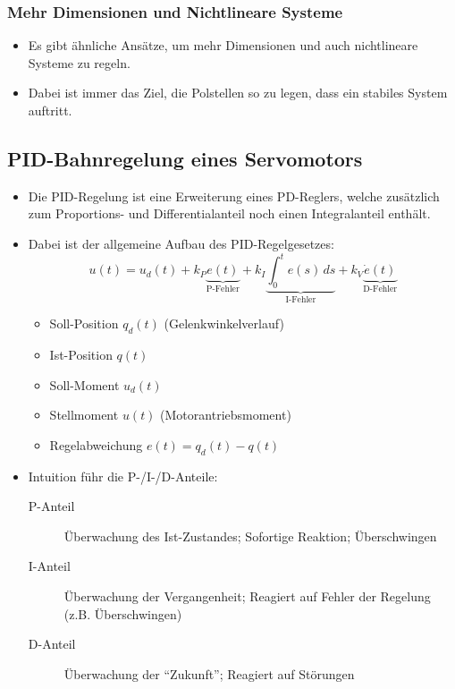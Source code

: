 			\subsubsection{Mehr Dimensionen und Nichtlineare Systeme}
				\begin{itemize}
					\item Es gibt ähnliche Ansätze, um mehr Dimensionen und auch nichtlineare Systeme zu regeln.
					\item Dabei ist immer das Ziel, die Polstellen so zu legen, dass ein stabiles System auftritt.
				\end{itemize}

		\subsection{PID-Bahnregelung eines Servomotors} %
			\begin{itemize}
				\item Die PID-Regelung ist eine Erweiterung eines PD-Reglers, welche zusätzlich zum Proportions- und Differentialanteil noch einen Integralanteil enthält.
				\item Dabei ist der allgemeine Aufbau des PID-Regelgesetzes:
					\begin{equation*}
						u(t) = u _ d (t) + k _ P \underbrace{e(t)}_{\text{P-Fehler}} + k _ I \underbrace{\int_{0}^{t} \! e(s) \, ds}_{\text{I-Fehler}} + k _ V \underbrace{\dot{e} (t)}_{\text{D-Fehler}}
					\end{equation*}
					\begin{itemize}
						\item Soll-Position \( q _ d (t) \) (Gelenkwinkelverlauf)
						\item Ist-Position \( q (t) \)
						\item Soll-Moment \( u _ d (t) \)
						\item Stellmoment \( u(t) \) (Motorantriebsmoment)
						\item Regelabweichung \( e(t) = q _ d (t) - q(t) \)
					\end{itemize}
				\item Intuition führ die P-/I-/D-Anteile:
					\begin{description}
						\item[P-Anteil] Überwachung des Ist-Zustandes; Sofortige Reaktion; Überschwingen
						\item[I-Anteil] Überwachung der Vergangenheit; Reagiert auf Fehler der Regelung (z.B. Überschwingen)
						\item[D-Anteil] Überwachung der \enquote{Zukunft}; Reagiert auf Störungen
					\end{description}
			\end{itemize}

